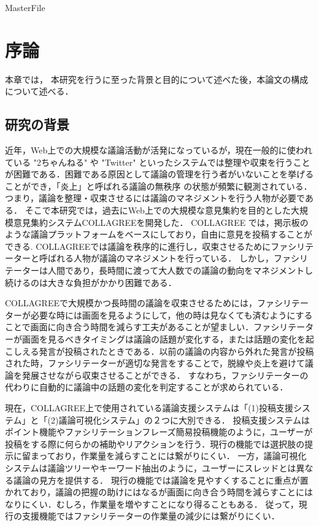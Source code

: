 \expandafter\ifx\csname MasterFile\endcsname\relax
	\def\SubFile{hoge}
	
	
	\setcounter{chapter}{0}
	\fi
\cleardoublepage
\chapter{序論}
\label{intro:chapter}
本章では， 本研究を行うに至った背景と目的について述べた後，本論文の構成について述べる．
\section{研究の背景}
\label{intro:background}
近年，Web上での大規模な議論活動が活発になっているが，現在一般的に使われている "2ちゃんねる" や "Twitter" といったシステムでは整理や収束を行うことが困難である．困難である原因として議論の管理を行う者がいないことを挙げることができ，「炎上」と呼ばれる議論の無秩序
の状態が頻繁に観測されている．
つまり，議論を整理・収束させるには議論のマネジメントを行う人物が必要である．
そこで本研究では，過去にWeb上での大規模な意見集約を目的とした大規模意見集約システムCOLLAGREE\cite{collagreeTest}を開発した．
COLLAGREE では，掲示板のような議論プラットフォームをベースにしており，自由に意見を投稿することができる.
COLLAGREEでは議論を秩序的に進行し，収束させるためにファシリテーターと呼ばれる人物が議論のマネジメントを行っている．
しかし，ファシリテーターは人間であり，長時間に渡って大人数での議論の動向をマネジメントし続けるのは大きな負担がかかり困難である．

COLLAGREEで大規模かつ長時間の議論を収束させるためには，ファシリテーターが必要な時には画面を見るようにして，他の時は見なくても済むようにすることで画面に向き合う時間を減らす工夫があることが望ましい．ファシリテーターが画面を見るべきタイミングは議論の話題が変化する，または話題の変化を起こしえる発言が投稿されたときである．以前の議論の内容から外れた発言が投稿された時，ファシリテーターが適切な発言をすることで，脱線や炎上を避けて議論を発展させながら収束させることができる．
すなわち，ファシリテーターの代わりに自動的に議論中の話題の変化を判定することが求められている．

現在，COLLAGREE上で使用されている議論支援システムは「(1)投稿支援システム」と「(2)議論可視化システム」の２つに大別できる．
投稿支援システムはポイント機能やファシリテーションフレーズ簡易投稿機能のように，ユーザーが投稿をする際に何らかの補助やリアクションを行う．現行の機能では選択肢の提示に留まっており，作業量を減らすことには繋がりにくい．
一方，議論可視化システムは議論ツリーやキーワード抽出のように，ユーザーにスレッドとは異なる議論の見方を提供する．
現行の機能では議論を見やすくすることに重点が置かれており，議論の把握の助けにはなるが画面に向き合う時間を減らすことにはなりにくい．むしろ，作業量を増やすことになり得ることもある．
従って，現行の支援機能ではファシリテーターの作業量の減少には繋がりにくい．

